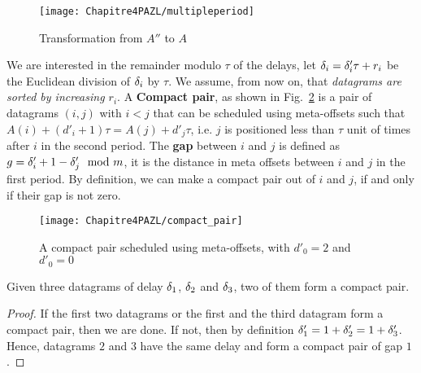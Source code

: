 \begin{figure}
 \begin{center}
\texttt{[image: Chapitre4PAZL/multipleperiod]}
\end{center}
\caption{Transformation from $A''$ to $A$}
\label{fig:multipleperiod}
\end{figure}


We are interested in the remainder modulo $\tau$ of the delays, let $\delta_i = \delta_{i}'\tau + r_i$ be the Euclidean division of $\delta_i$ by $\tau$. We assume, from now on, that \emph{datagrams are sorted by increasing $r_i$}.
A \textbf{Compact pair}, as shown in Fig.~\ref{fig:compactpair} is a pair of datagrams $(i,j)$ with $i < j$ that can be scheduled using meta-offsets such that $A(i) + (d'_i+1)\tau = A(j) + d'_j\tau$, i.e. $j$ is positioned less than $\tau$ unit of times after $i$ in the second period.
The \textbf{gap} between $i$ and $j$ is defined as  $g = \delta_{i}' + 1 - \delta_{j}' \mod m$, it is the distance in meta offsets between $i$ and $j$ in the first period. By definition, we can make a compact pair out of $i$ and $j$, if and only if their gap is not zero.

\begin{figure}[h]
\begin{center}



\texttt{[image: Chapitre4PAZL/compact\_pair]}
\end{center}
\caption{A compact pair scheduled using meta-offsets, with $d'_0 = 2$ and $d'_0 = 0$}
\label{fig:compactpair}
\end{figure}

\begin{lemma}\label{lemma:pair_find}
Given three datagrams of delay $\delta_{1}$, $\delta_{2}$ and $\delta_{3}$, two of them form a compact pair. 
\end{lemma}
\begin{proof}
If the first two datagrams or the first and the third datagram form a compact pair,
then we are done. If not, then by definition $\delta_{1}' = 1 + \delta_{2}' = 1 + \delta_{3}'$. Hence, datagrams $2$ and $3$ have the same delay and form a compact pair of gap $1$.
\end{proof}

